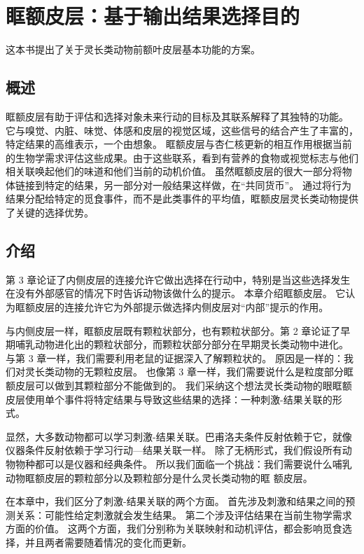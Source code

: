 \chapter{眶额皮层：基于输出结果选择目的} \label{chap:chap4}
这本书提出了关于灵长类动物前额叶皮层基本功能的方案。

\section{概述}
眶额皮层有助于评估和选择对象未来行动的目标及其联系解释了其独特的功能。 它与嗅觉、内脏、味觉、体感和皮层的视觉区域，这些信号的结合产生了丰富的，特定结果的高维表示，一个由想象。 眶额皮层与杏仁核更新的相互作用根据当前的生物学需求评估这些成果。由于这些联系，看到有营养的食物或视觉标志与他们相关联唤起他们的味道和他们当前的动机价值。 虽然眶额皮层的很大一部分将物体链接到特定的结果，另一部分对一般结果这样做，在“共同货币”。 通过将行为结果分配给特定的觅食事件，而不是此类事件的平均值，眶额皮层灵长类动物提供了关键的选择优势。
\section{介绍}
第 3 章论证了内侧皮层的连接允许它做出选择在行动中，特别是当这些选择发生在没有外部感官的情况下时告诉动物该做什么的提示。 本章介绍眶额皮层。 它认为眶额皮层的连接允许它为外部提示做选择内侧皮层对“内部”提示的作用。\par
与内侧皮层一样，眶额皮层既有颗粒状部分，也有颗粒状部分。第 2 章论证了早期哺乳动物进化出的颗粒状部分，而颗粒状部分部分在早期灵长类动物中进化。 与第 3 章一样，我们需要利用老鼠的证据深入了解颗粒状的。 原因是一样的：我们对灵长类动物的无颗粒皮层。 也像第 3 章一样，我们需要说什么是粒度部分眶额皮层可以做到其颗粒部分不能做到的。 我们采纳这个想法灵长类动物的眼眶额皮层使用单个事件将特定结果与导致这些结果的选择：一种刺激-结果关联的形式。\par
显然，大多数动物都可以学习刺激-结果关联。巴甫洛夫条件反射依赖于它，就像仪器条件反射依赖于学习行动—结果关联一样。 除了无柄形式，我们假设所有动物物种都可以是仪器和经典条件。 所以我们面临一个挑战：我们需要说什么哺乳动物眶额皮层的颗粒部分以及颗粒部分是什么灵长类动物的眶 额皮层。\par
在本章中，我们区分了刺激-结果关联的两个方面。 首先涉及刺激和结果之间的预测关系：可能性给定刺激就会发生结果。 第二个涉及评估结果在当前生物学需求方面的价值。 这两个方面，我们分别称为关联映射和动机评估，都会影响觅食选择，并且两者需要随着情况的变化而更新。\par
